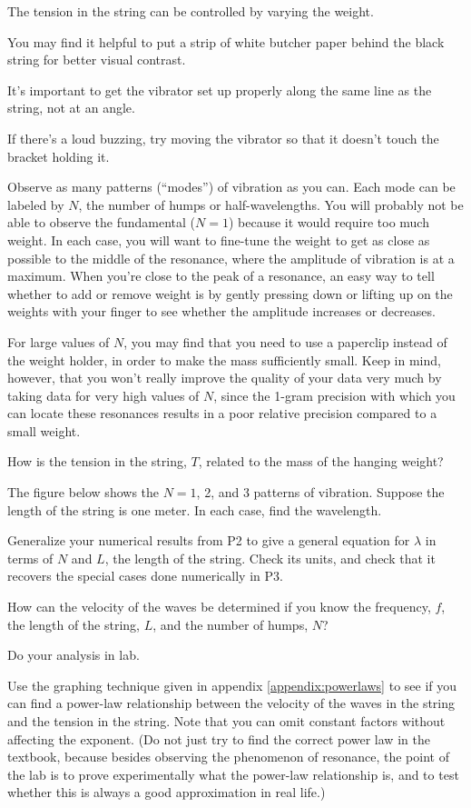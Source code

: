 The tension in the string
can be controlled by varying the weight.

You may find it helpful to put a strip of white butcher paper
behind the black string for better visual contrast.

It's important to get the vibrator set up properly along the
same line as the string, not at an angle.

If there's a loud buzzing, try moving the vibrator so that it doesn't
touch the bracket holding it.

\observations

Observe as many patterns (``modes'') of vibration as you can. Each mode
can be labeled by $N$, the number of humps or half-wavelengths.  You will
probably not be able to observe the fundamental ($N=1$)
because it would require too much weight.  In each
case, you will want to fine-tune the weight to get as close
as possible to the middle of the resonance, where the
amplitude of vibration is at a maximum.  When you're close
to the peak of a resonance, an easy way to tell whether to
add or remove weight is by gently pressing down or lifting
up on the weights with your finger to see whether the
amplitude increases or decreases.

For large values of $N$, you may find that you need to use a
paperclip instead of the weight holder, in order to make the mass
sufficiently small. Keep in mind, however, that you won't really
improve the quality of your data very much by taking data for very
high values of $N$, since the 1-gram precision with which you can
locate these resonances results in a poor relative precision
compared to a small weight.

\prelab

\prelabquestion  How is the tension in the string, $T$, related to the
mass of the hanging weight?

\prelabquestion The figure below shows the $N=1$, 2, and 3 patterns
of vibration. Suppose the length of the string is one meter. In each case,
find the wavelength.


\prelabquestion Generalize your numerical results from P2 to give a general
equation for $\lambda$ in terms of $N$ and $L$, the length of the string. Check its units, and check
that it recovers the special cases done numerically in P3.

\prelabquestion  How can the velocity of the waves be determined if you
know the frequency, $f$, the length of the string, $L$, and
the number of humps, $N$?

\selfcheck

Do your analysis in lab.

\analysis

Use the graphing technique given in appendix \ref{appendix:powerlaws} to see if you can
find a power-law relationship between the velocity of the
waves in the string and the tension in the string.  Note that you can omit
constant factors without affecting the exponent. (Do not
just try to find the correct power law in the textbook,
because besides observing the phenomenon of resonance, the
point of the lab is to prove experimentally what the
power-law relationship is, and to test whether this is
always a good approximation in real life.)
